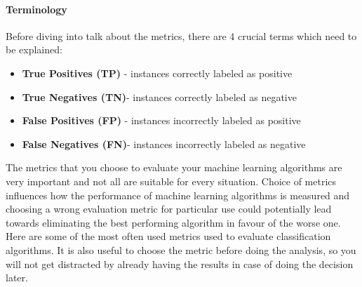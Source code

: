 \paragraph{Terminology} Before diving into talk about the metrics, there are 4 crucial terms which need to be explained:
\begin{itemize}
\item \textbf{True Positives (TP)} - instances correctly labeled as positive
\item \textbf{True Negatives (TN)}- instances correctly labeled as negative
\item \textbf{False Positives (FP)} - instances incorrectly labeled as positive
\item \textbf{False Negatives (FN)}- instances incorrectly labeled as negative
\end{itemize}


The metrics that you choose to evaluate your machine learning algorithms are very important and not all are suitable for every situation. Choice of metrics influences how the performance of machine learning algorithms is measured and choosing a wrong evaluation metric for particular use could potentially lead towards eliminating the best performing algorithm in favour of the worse one.
Here are some of the most often used metrics used to evaluate classification algorithms. It is also useful to choose the metric before doing the analysis, so you will not get distracted by already having the results in case of doing the decision later.

